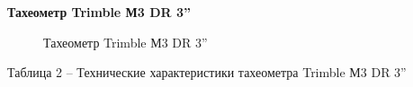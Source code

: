 \documentclass[a4paper]{article}
\begin{document}
\begin{newpage}

    \begin{center}
        \textbf{Тахеометр Trimble М3 DR 3”}
    \end{center}
    
    \begin{figure}[h]
        \caption{Тахеометр Trimble М3 DR 3”}
        \label{fig:image}
    \end{figure}
    
    \begin{center}
        \begin{flushleft}
            Таблица 2 – Технические характеристики тахеометра Trimble М3 DR 3”
        \end{flushleft}
     

\end{center}
\end{newpage}
\end{document}
